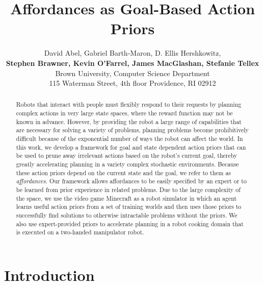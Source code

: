 \documentclass[letterpaper]{article}
\begin{document}
\title{Affordances as Goal-Based Action Priors}

\author{David Abel, Gabriel Barth-Maron, D. Ellis Hershkowitz, \\ {\Large {\bf Stephen Brawner, Kevin O'Farrel, James MacGlashan, Stefanie Tellex}}\\
Brown University, Computer Science Department\\
115 Waterman Street, 4th floor
Providence, RI 02912
}

\maketitle

\begin{abstract}
Robots that interact with people must flexibly respond to their
requests by planning complex actions in very large state spaces, where
the reward function may not be known in advance.  However, by
providing the robot a large range of capabilities that are necessary
for solving a variety of problems, planning problems become
prohibitively difficult because of the exponential number of ways the
robot can affect the world.  In this work, we develop a framework for
goal and state dependent action priors that can be used to prune away
irrelevant actions based on the robot's current goal, thereby greatly
accelerating planning in a variety complex stochastic environments.
Because these action priors depend on the current state and the goal,
we refer to them as {\em affordances}.  Our framework allows
affordances to be easily specified by an expert or to be learned from
prior experience in related problems. Due to the large complexity of
the space, we use the video game Minecraft as a robot simulator in
which an agent learns useful action priors from a set of training
worlds and then uses those priors to successfully find solutions to
otherwise intractable problems without the priors. We also use
expert-provided priors to accelerate planning in a robot cooking
domain that is executed on a two-handed manipulator robot.
\end{abstract}


\section{Introduction}
\label{sec:introduction}
\end{document}
